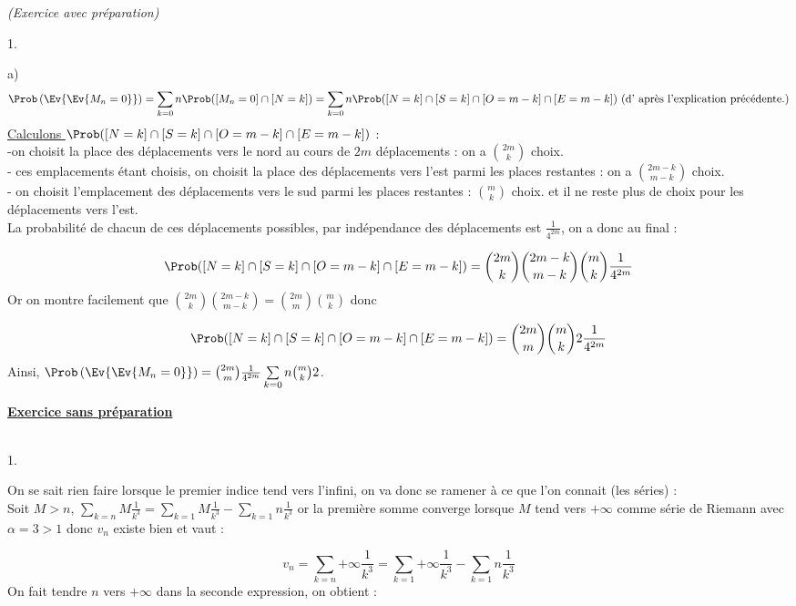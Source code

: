 \documentclass[11pt]{article}%
\begin{document}
\begin{exercice}{\it (Exercice avec préparation)}
\begin{noliste}{1.}
\begin{noliste}{a)}
\[
 \Prob\left(\Ev{\Ev{M_{n} = 0}}\right) = \sum \limits_{k = 0}{n}
\Prob([M_{n} = 0] \cap [N = k]) = \sum \limits_{k = 0}{n} \Prob( [N =
k]\cap [S = k] \cap [O = m-k] \cap [E = m-k]) \text{ (d' après
l'explication précédente.)}
\]
 \underline{ Calculons $\Prob( [N = k]\cap [S = k] \cap [O = m-k] \cap
[E = m-k])$} :\\
 -on choisit la place des déplacements vers le nord au cours de $2m$
déplacements : on a $\binom{2m}{k}$ choix.\\
 - ces emplacements étant choisis, on choisit la place des déplacements
vers l'est parmi les places restantes : on a $\binom{2m-k}{m-k}$
choix.\\
 - on choisit l'emplacement des déplacements vers le sud parmi les
places restantes : $\binom{m}{k}$ choix. et il ne reste plus de choix
pour les déplacements vers l'est. \\
 La probabilité de chacun de ces déplacements possibles, par
indépendance des déplacements est $\frac{1}{4^{2m}}$, on a donc au
final : 
 
\[
 \Prob( [N = k]\cap [S = k] \cap [O = m-k] \cap [E = m-k]) =
\binom{2m}{k} \binom{2m-k}{m-k} \binom{m}{k} \frac{1}{4^{2m}}
\]
 Or on montre facilement que $\binom{2m}{k} \binom{2m-k}{m-k} =
\binom{2m}{m} \binom{m}{k}$ donc 
 
\[
 \Prob( [N = k]\cap [S = k] \cap [O = m-k] \cap [E = m-k]) =
\binom{2m}{m} \binom{m}{k}{2} \frac{1}{4^{2m}}
\]
 Ainsi, $\Prob\left(\Ev{\Ev{M_{n} = 0}}\right) = \binom{2m}{m}
\frac{1}{4^{2m}} \sum \limits_{k = 0}{n} \binom{m}{k}{2}$.
 \end{noliste}
 \end{noliste}
 \textbf{\underline{Exercice sans préparation}} \\
\\
 \begin{noliste}{1.}
 \setlength{\itemsep}{4mm}
 \item On se sait rien faire lorsque le premier indice tend vers
l'infini, on va donc se ramener à ce que l'on connait (les séries) : \\
 Soit $M >n$, $\sum \limits_{k = n}{M} \frac{1}{k^{3}} = \sum
\limits_{k = 1}{M} \frac{1}{k^{3}}-\sum \limits_{k = 1}{n}
\frac{1}{k^{3}}$ or la première somme converge lorsque $M$ tend vers $
+ \infty$ comme série de Riemann avec $\alpha = 3 >1$ donc $v_{n}$
existe bien et vaut : 
 
\[
 v_{n} = \sum \limits_{k = n}{+ \infty} \frac{1}{k^{3}} = \sum
\limits_{k = 1}{+ \infty} \frac{1}{k^{3}}-\sum \limits_{k = 1}{n}
\frac{1}{k^{3}}
\]
 On fait tendre $n$ vers $ + \infty$ dans la seconde expression, on
obtient : 
 

\end{noliste}
\end{exercice}
\end{document}
